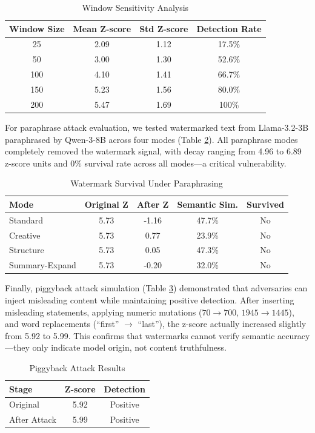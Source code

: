 \documentclass[12pt,letterpaper]{article}
\begin{document}
\begin{table}[H]
\centering
\caption{Window Sensitivity Analysis}
\label{tab:window}
\begin{tabular}{cccc}
\toprule
Window Size & Mean Z-score & Std Z-score & Detection Rate \\
\midrule
25 & 2.09 & 1.12 & 17.5\% \\
50 & 3.00 & 1.30 & 52.6\% \\
100 & 4.10 & 1.41 & 66.7\% \\
150 & 5.23 & 1.56 & 80.0\% \\
200 & 5.47 & 1.69 & 100\% \\
\bottomrule
\end{tabular}
\end{table}

For paraphrase attack evaluation, we tested watermarked text from Llama-3.2-3B paraphrased by Qwen-3-8B across four modes (Table \ref{tab:paraphrase}). All paraphrase modes completely removed the watermark signal, with decay ranging from 4.96 to 6.89 z-score units and 0\% survival rate across all modes---a critical vulnerability.

\begin{table}[H]
\centering
\caption{Watermark Survival Under Paraphrasing}
\label{tab:paraphrase}
\begin{tabular}{lcccc}
\toprule
\textbf{Mode} & \textbf{Original Z} & \textbf{After Z} & \textbf{Semantic Sim.} & \textbf{Survived} \\
\midrule
Standard & 5.73 & -1.16 & 47.7\% & No \\
Creative & 5.73 & 0.77 & 23.9\% & No \\
Structure & 5.73 & 0.05 & 47.3\% & No \\
Summary-Expand & 5.73 & -0.20 & 32.0\% & No \\
\bottomrule
\end{tabular}
\end{table}

Finally, piggyback attack simulation (Table \ref{tab:piggyback}) demonstrated that adversaries can inject misleading content while maintaining positive detection. After inserting misleading statements, applying numeric mutations ($70 \rightarrow 700$, $1945 \rightarrow 1445$), and word replacements (``first'' $\rightarrow$ ``last''), the z-score actually increased slightly from 5.92 to 5.99. This confirms that watermarks cannot verify semantic accuracy---they only indicate model origin, not content truthfulness.

\begin{table}[H]
\centering
\caption{Piggyback Attack Results}
\label{tab:piggyback}
\begin{tabular}{lcc}
\toprule
\textbf{Stage} & \textbf{Z-score} & \textbf{Detection} \\
\midrule
Original & 5.92 & Positive \\
After Attack & 5.99 & Positive \\
\bottomrule
\end{tabular}
\end{table}
\end{document}

